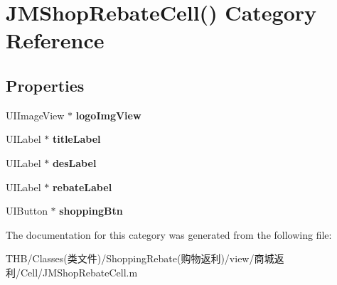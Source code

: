\hypertarget{category_j_m_shop_rebate_cell_07_08}{}\section{J\+M\+Shop\+Rebate\+Cell() Category Reference}
\label{category_j_m_shop_rebate_cell_07_08}
\subsection*{Properties}
\begin{DoxyCompactItemize}
\item 
\mbox{\label{category_j_m_shop_rebate_cell_07_08_a14446920ce3c8a66be5e7c9b57c7f194}} 
U\+I\+Image\+View $\ast$ {\bfseries logo\+Img\+View}
\item 
\mbox{\label{category_j_m_shop_rebate_cell_07_08_a2b2c820dfd578081e5ddcd1bc3c2e7f8}} 
U\+I\+Label $\ast$ {\bfseries title\+Label}
\item 
\mbox{\label{category_j_m_shop_rebate_cell_07_08_aab7b9a775bc19d51b569e4e93b7d5778}} 
U\+I\+Label $\ast$ {\bfseries des\+Label}
\item 
\mbox{\label{category_j_m_shop_rebate_cell_07_08_a8a460a7c1231ad506067cf79263ab8fa}} 
U\+I\+Label $\ast$ {\bfseries rebate\+Label}
\item 
\mbox{\label{category_j_m_shop_rebate_cell_07_08_aed5e00fc67e718af551d2311541188e2}} 
U\+I\+Button $\ast$ {\bfseries shopping\+Btn}
\end{DoxyCompactItemize}


The documentation for this category was generated from the following file\+:\begin{DoxyCompactItemize}
\item 
T\+H\+B/\+Classes(类文件)/\+Shopping\+Rebate(购物返利)/view/商城返利/\+Cell/J\+M\+Shop\+Rebate\+Cell.\+m\end{DoxyCompactItemize}

